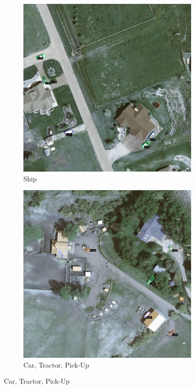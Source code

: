 \begin{figure}[h!]
    \begin{subfigure}[t]{0.38\textwidth}
        \centering
        \includegraphics[width=\linewidth]{images/015Results/02perm_exp/comp_images/rgbir/509.png}
        \caption{Ship}
    \end{subfigure}
    \begin{subfigure}[t]{0.38\textwidth}
        \centering
        \includegraphics[width=\linewidth]{images/015Results/02perm_exp/comp_images/rgbir/523.png}
        \caption{Car, Tractor, Pick-Up}
    \end{subfigure}
    

\end{figure}
